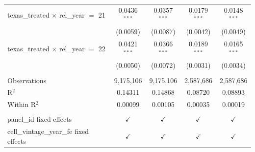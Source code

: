 \begin{tabular}{lcccc}
   texas\_treated $\times$ rel\_year $=$ 21     & 0.0436$^{***}$ & 0.0357$^{***}$ & 0.0179$^{***}$  & 0.0148$^{***}$\\   
                                                & (0.0059)       & (0.0087)       & (0.0042)        & (0.0049)\\   
   texas\_treated $\times$ rel\_year $=$ 22     & 0.0421$^{***}$ & 0.0366$^{***}$ & 0.0189$^{***}$  & 0.0165$^{***}$\\   
                                                & (0.0050)       & (0.0072)       & (0.0031)        & (0.0034)\\   
    \\
   Observations                                 & 9,175,106      & 9,175,106      & 2,587,686       & 2,587,686\\  
   R$^2$                                        & 0.14311        & 0.14868        & 0.08720         & 0.08893\\  
   Within R$^2$                                 & 0.00099        & 0.00105        & 0.00035         & 0.00019\\  
    \\
   panel\_id fixed effects                      & $\checkmark$   & $\checkmark$   & $\checkmark$    & $\checkmark$\\   
   cell\_vintage\_year\_fe fixed effects        & $\checkmark$   & $\checkmark$   & $\checkmark$    & $\checkmark$\\   
   \bottomrule
\end{tabular}
\par\endgroup


